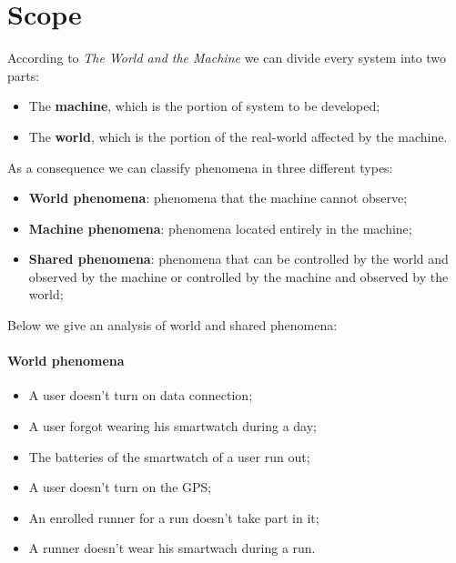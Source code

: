 \section{Scope}
According to \textit{The World and the Machine} \cite{world-machine} we can divide every system into two parts:
\begin{itemize}
  \item The \textbf{machine}, which is the portion of system to be developed;
  \item The \textbf{world}, which is the portion of the real-world affected by the machine.
\end{itemize}
As a consequence we can classify phenomena in three different types:
\begin{itemize}
  \item \textbf{World phenomena}: phenomena that the machine cannot observe;
  \item \textbf{Machine phenomena}: phenomena located entirely in the machine;
  \item \textbf{Shared phenomena}: phenomena that can be controlled by the world and observed by the machine or controlled by the machine and observed by the world;
\end{itemize}
Below we give an analysis of world and shared phenomena:
\paragraph{World phenomena}
\begin{itemize}
  \item A user doesn't turn on data connection;
  \item A user forgot wearing his smartwatch during a day;
  \item The batteries of the smartwatch of a user run out;
  \item A user doesn't turn on the GPS;
  \item An enrolled runner for a run doesn't take part in it;
  \item A runner doesn't wear his smartwach during a run.
\end{itemize}
